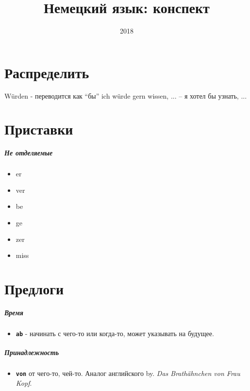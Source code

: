 \documentclass[12pt]{report}
\title{Немецкий язык: конспект}
\date{2018}
\newcommand{\term}[1]{\texttt{\textbf{#1}}}
\newcommand{\ubersatze}[1]{\textit{#1}}
\begin{document}
\tableofcontents

\chapter{Распределить}

Würden - переводится как ``бы''
ich würde gern wissen, ... -- я хотел бы узнать, ...

\chapter{Приставки}

\paragraph{Не отделяемые}
\begin{itemize}
 \item er
 \item ver
 \item be
 \item ge
 \item zer
 \item miss
\end{itemize}

\chapter{Предлоги}
\paragraph{Время}
\begin{itemize}
 \item \term{ab} - начинать с чего-то или когда-то, может указывать на будущее.
\end{itemize}

\paragraph{Принадлежность}
\begin{itemize}
\item \term{von} от чего-то, чей-то. Аналог английского by. \ubersatze{Das Brathähnchen von Frau Kopf}.
\end{itemize}


\newpage

\newpage
\end{document}
